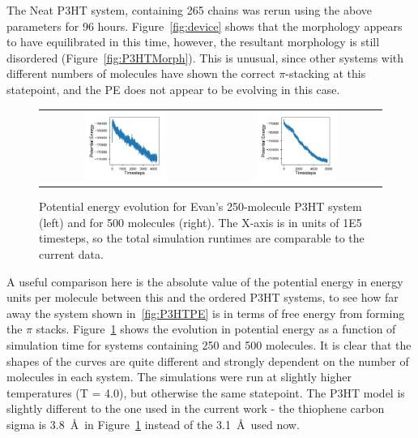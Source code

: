 \documentclass[12pt]{article}
\begin{document}
The Neat P3HT system, containing 265 chains was rerun using the above parameters for 96 hours.
Figure~\ref{fig:device} shows that the morphology appears to have equilibrated in this time, however, the resultant morphology is still disordered (Figure~\ref{fig:P3HTMorph}).
This is unusual, since other systems with different numbers of molecules have shown the correct $\pi$-stacking at this statepoint, and the PE does not appear to be evolving in this case.


\begin{figure}[h!]\centering
    \begin{tabular}{cc}
        \includegraphics[width=0.5\textwidth]{Figures/P3HT250.pdf}&
	    \includegraphics[width=0.5\textwidth]{Figures/P3HT500.pdf}
    \end{tabular}
    \caption{Potential energy evolution for Evan's 250-molecule P3HT system (left) and for 500 molecules (right).
    The X-axis is in units of 1E5 timesteps, so the total simulation runtimes are comparable to the current data.}
	\label{fig:P3HTPEs}
\end{figure}


A useful comparison here is the absolute value of the potential energy in energy units per molecule between this and the ordered P3HT systems, to see how far away the system shown in~\ref{fig:P3HTPE} is in terms of free energy from forming the $\pi$ stacks.
Figure~\ref{fig:P3HTPEs} shows the evolution in potential energy as a function of simulation time for systems containing 250 and 500 molecules.
It is clear that the shapes of the curves are quite different and strongly dependent on the number of molecules in each system.
The simulations were run at slightly higher temperatures (T = 4.0), but otherwise the same statepoint.
The P3HT model is slightly different to the one used in the current work - the thiophene carbon sigma is 3.8~\AA~in Figure~\ref{fig:P3HTPEs} instead of the 3.1~\AA~used now.
\end{document}
